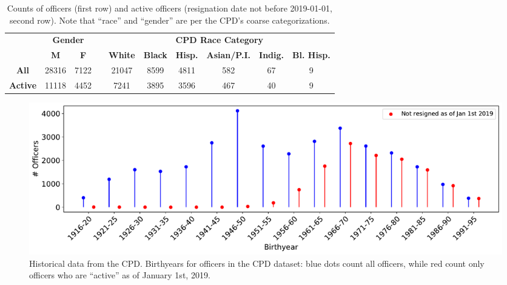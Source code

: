 \begin{table}[t!]
\caption{Counts of officers (first row) and active officers (resignation date not before 2019-01-01, second row). 
Note that ``race'' and ``gender'' are per the CPD's coarse categorizations.} \label{tab:stats}
\begin{tabular}{l|c|c|c|c|c|c|c|c|c|}
\cline{2-3} \cline{5-10}
                                               & \multicolumn{2}{c|}{\textbf{Gender}} & \multicolumn{1}{l|}{} & \multicolumn{6}{c|}{\textbf{CPD Race Category}}                                                                                                                                                   \\ \cline{2-3} \cline{5-10} 
                                               & {\textbf{M}}   & {\textbf{F}}   &                       & {\textbf{White}} & {\textbf{Black}} & \multicolumn{1}{l|}{{\textbf{Hisp.}}} & {\textbf{Asian/P.I.}} & \multicolumn{1}{l|}{{\textbf{Indig.}}} & {\textbf{Bl. Hisp.}} \\ \cline{1-3} \cline{5-10} 
\multicolumn{1}{|c|}{\textbf{All}}    & 28316                 & 7122                  &                       & 21047                   & 8599                    & 4811                                         & 582                     & 67                                              & 9                           \\ \cline{1-3} \cline{5-10} 
\multicolumn{1}{|c|}{\textbf{Active}} & 11118                 & 4452                  &                       & 7241                    & 3895                    & 3596                                         & 467                     & 40                                              & 9                           \\ \cline{1-3} \cline{5-10} 
\end{tabular} 
\end{table}

\begin{figure}[h] 
	\includegraphics[width=\textwidth]{figs/history_by} 
	\caption{Historical data from the CPD. Birthyears for officers in the CPD dataset: blue dots count all officers, while red count only officers who are ``active'' as of January 1st, 2019.} \label{fig:history_by}
\end{figure}

